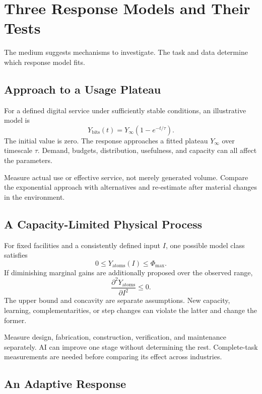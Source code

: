 \section{Three Response Models and Their Tests}

The medium suggests mechanisms to investigate. The task and data determine which response model fits.

\subsection{Approach to a Usage Plateau}

For a defined digital service under sufficiently stable conditions, an illustrative model is
\begin{equation}
 Y_{\mathrm{bits}}(t)=Y_\infty(1-e^{-t/\tau}).
\end{equation}
The initial value is zero. The response approaches a fitted plateau $Y_\infty$ over timescale $\tau$. Demand, budgets, distribution, usefulness, and capacity can all affect the parameters.

Measure actual use or effective service, not merely generated volume. Compare the exponential approach with alternatives and re-estimate after material changes in the environment.

\subsection{A Capacity-Limited Physical Process}

For fixed facilities and a consistently defined input $I$, one possible model class satisfies
\begin{equation}
 0\leq Y_{\mathrm{atoms}}(I)\leq\Phi_{\max}.
\end{equation}
If diminishing marginal gains are additionally proposed over the observed range,
\begin{equation}
 \frac{\partial^2Y_{\mathrm{atoms}}}{\partial I^2}\leq0.
\end{equation}
The upper bound and concavity are separate assumptions. New capacity, learning, complementarities, or step changes can violate the latter and change the former.

Measure design, fabrication, construction, verification, and maintenance separately. AI can improve one stage without determining the rest. Complete-task measurements are needed before comparing its effect across industries.

\subsection{An Adaptive Response}

